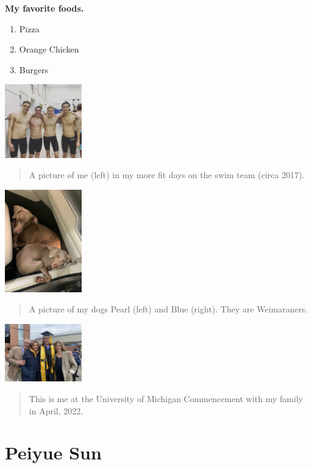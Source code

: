 \documentclass[
]{book}
\providecommand{\tightlist}{%
  \setlength{\itemsep}{0pt}\setlength{\parskip}{0pt}}
\theoremstyle{definition}
\theoremstyle{definition}
\theoremstyle{definition}
\theoremstyle{definition}
\theoremstyle{remark}
\begin{document}
\textbf{My favorite foods.}

\begin{enumerate}
\def\labelenumi{\arabic{enumi}.}
\tightlist
\item
  Pizza
\item
  Orange Chicken
\item
  Burgers
\end{enumerate}

\includegraphics[width=0.25\textwidth,height=\textheight]{swimmers.jpg}

\begin{quote}
A picture of me (left) in my more fit days on the swim team (circa 2017).
\end{quote}

\includegraphics[width=0.25\textwidth,height=\textheight]{dogs.jpeg}

\begin{quote}
A picture of my dogs Pearl (left) and Blue (right). They are Weimaraners.
\end{quote}

\includegraphics[width=0.25\textwidth,height=\textheight]{Graduation.jpg}

\begin{quote}
This is me at the University of Michigan Commencement with my family in April, 2022.
\end{quote}

\hypertarget{peiyue-sun}{%
\section{Peiyue Sun}\label{peiyue-sun}}
\end{document}
